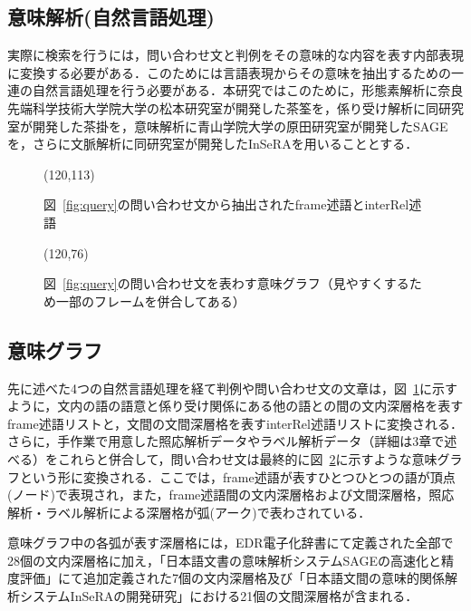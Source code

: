 \subsection{意味解析(自然言語処理)}
実際に検索を行うには，問い合わせ文と判例をその意味的な内容を表す内部表現に変換する必要がある．このためには言語表現からその意味を抽出するための一連の自然言語処理を行う必要がある．本研究ではこのために，形態素解析に奈良先端科学技術大学院大学の松本研究室が開発した茶筌\cite{chasen}を，係り受け解析に同研究室が開発した茶掛を，意味解析に青山学院大学の原田研究室が開発したSAGE\cite{sage99,harada,sage2000}を，さらに文脈解析に同研究室が開発したInSeRA\cite{insera}を用いることとする．

\begin{figure}
\begin{center}
 \atari(120,113)
 \caption{図~\ref{fig:query}の問い合わせ文から抽出されたframe述語とinterRel述語}
 \label{fig:frame}
\end{center}
\end{figure}

\begin{figure}
\begin{center}
 \atari(120,76)
 \caption{図~\ref{fig:query}の問い合わせ文を表わす意味グラフ（見やすくするため一部のフレームを併合してある）}
 \label{fig:graph}
\end{center}
\end{figure}

\subsection{意味グラフ}
先に述べた4つの自然言語処理を経て判例や問い合わせ文の文章は，図~\ref{fig:frame}に示すように，文内の語の語意と係り受け関係にある他の語との間の文内深層格を表すframe述語リストと，文間の文間深層格を表すinterRel述語リストに変換される．さらに，手作業で用意した照応解析データやラベル解析データ（詳細は3章で述べる）をこれらと併合して，問い合わせ文は最終的に図~\ref{fig:graph}に示すような意味グラフという形に変換される．ここでは，frame述語が表すひとつひとつの語が頂点(ノード)で表現され，また，frame述語間の文内深層格および文間深層格，照応解析・ラベル解析による深層格が弧(アーク)で表わされている．

意味グラフ中の各弧が表す深層格には，EDR電子化辞書\cite{edr}にて定義された全部で28個の文内深層格に加え，「日本語文書の意味解析システムSAGEの高速化と精度評価」\cite{sage2000}にて追加定義された7個の文内深層格及び「日本語文間の意味的関係解析システムInSeRAの開発研究」\cite{insera}における21個の文間深層格が含まれる．


